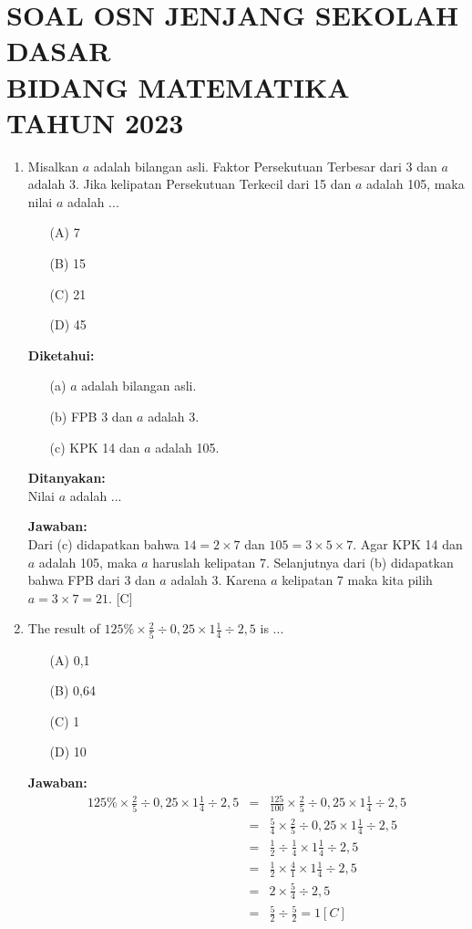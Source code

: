\documentclass{article}
\begin{document}
{\centering \section*{SOAL OSN JENJANG SEKOLAH DASAR\\ BIDANG MATEMATIKA \\ TAHUN 2023}}

\begin{enumerate}
  \item Misalkan $a$ adalah bilangan asli. Faktor Persekutuan Terbesar dari 3 dan $a$ adalah 3. Jika kelipatan Persekutuan Terkecil dari 15 dan $a$ adalah 105, maka nilai $a$ adalah ...
    \begin{enumerate}
        \item[(A)] 7
        \item[(B)] 15
        \item[(C)] 21
        \item[(D)] 45
    \end{enumerate}
    
    \textbf{Diketahui:}
        \begin{enumerate}
            \item[(a)] $a$ adalah bilangan asli.
            \item[(b)] FPB 3 dan $a$ adalah 3.
            \item[(c)] KPK 14 dan $a$ adalah 105.
        \end{enumerate}
    \textbf{Ditanyakan: }\\
        Nilai $a$ adalah ...
        
    \textbf{Jawaban:}\\
    Dari (c) didapatkan bahwa $14=2 \times 7$ dan $105 = 3\times 5\times 7$. Agar KPK 14 dan $a$ adalah 105, maka $a$ haruslah kelipatan 7. Selanjutnya dari (b) didapatkan bahwa FPB dari 3 dan $a$ adalah 3. Karena $a$ kelipatan 7 maka kita pilih $a=3\times 7=21$. [C]
    
  \item The result of $125 \% \times \frac{2}{5} \div 0,25 \times 1\frac{1}{4} \div 2,5$ is ...
      \begin{enumerate}
        \item[(A)] 0,1
        \item[(B)] 0,64
        \item[(C)] 1
        \item[(D)] 10
    \end{enumerate}
  \textbf{Jawaban:}
  \begin{eqnarray*}
  125 \% \times \frac{2}{5} \div 0,25 \times 1\frac{1}{4} \div 2,5 
  &=& \frac{125}{100} \times \frac{2}{5} \div 0,25 \times 1\frac{1}{4} \div 2,5 \\
  &=& \frac{5}{4} \times \frac{2}{5} \div 0,25 \times 1\frac{1}{4} \div 2,5 \\
  &=& \frac{1}{2} \div \frac{1}{4} \times 1\frac{1}{4} \div 2,5 \\
  &=& \frac{1}{2} \times \frac{4}{1} \times 1\frac{1}{4} \div 2,5 \\
  &=& 2 \times \frac{5}{4} \div 2,5 \\
  &=& \frac{5}{2} \div \frac{5}{2} = 1 [C]
  \end{eqnarray*}
  

\end{enumerate}
\end{document}
